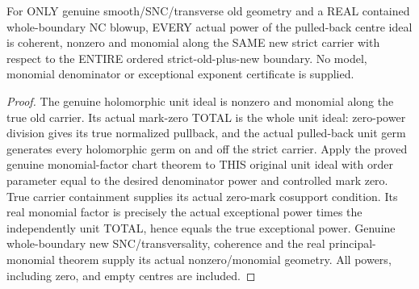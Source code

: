 \begin{lemma}
\label{hir:sharp-actual-new-exceptional-power-denominator-monomial}
\leanok
For ONLY genuine smooth/SNC/transverse old geometry and a REAL contained
whole-boundary NC blowup, EVERY actual power of the pulled-back centre
ideal is coherent, nonzero and monomial along the SAME new strict carrier
with respect to the ENTIRE ordered strict-old-plus-new boundary. No model,
monomial denominator or exceptional exponent certificate is supplied.
\end{lemma}
\begin{proof}
The genuine holomorphic unit ideal is nonzero and monomial along the true
old carrier. Its actual mark-zero TOTAL is the whole unit ideal: zero-power
division gives its true normalized pullback, and the actual pulled-back
unit germ generates every holomorphic germ on and off the strict carrier.
Apply the proved genuine monomial-factor chart theorem to THIS original
unit ideal with order parameter equal to the desired denominator power
and controlled mark zero. True carrier containment supplies its actual
zero-mark cosupport condition. Its real monomial factor is precisely the
actual exceptional power times the independently unit TOTAL, hence equals
the true exceptional power. Genuine whole-boundary new SNC/transversality,
coherence and the real principal-monomial theorem supply its actual
nonzero/monomial geometry. All powers, including zero, and empty centres
are included.
\end{proof}

